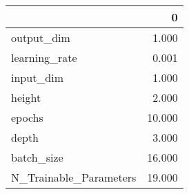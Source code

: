 \begin{tabular}{lr}
\toprule
{} &       0 \\
\midrule
output\_dim             &   1.000 \\
learning\_rate          &   0.001 \\
input\_dim              &   1.000 \\
height                 &   2.000 \\
epochs                 &  10.000 \\
depth                  &   3.000 \\
batch\_size             &  16.000 \\
N\_Trainable\_Parameters &  19.000 \\
\bottomrule
\end{tabular}
